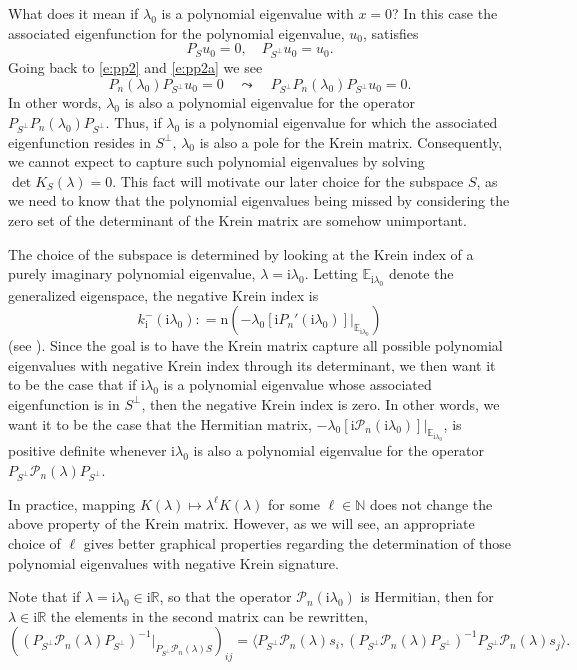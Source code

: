 \documentclass[review,onefignum,onetabnum]{siamart171218}
\newcommand{\E}{\mathbb{E}}
\newcommand{\N}{\mathbb{N}}
\newcommand{\R}{\mathbb{R}}
\def\det{\mathop\mathrm{det}\nolimits}
\def\coloneqq{\mathrel{\mathop:}=}
\newcommand{\rmi}{\mathrm{i}}
\newcommand{\rmn}{\mathrm{n}}
\newcommand{\calP}{\mathcal{P}}
\newcommand{\vK}{\bm{\mathit{K}}}
\newcommand{\vx}{\bm{\mathit{x}}}
\newcommand{\vn}{\bm{\mathit{0}}}
\begin{document}
What does it mean if $\lambda_0$ is a polynomial eigenvalue with $\vx=\vn$?
In this case the associated eigenfunction for the polynomial eigenvalue,
$u_0$, satisfies
\[
P_Su_0=0,\quad P_{S^\perp}u_0=u_0.
\]
Going back to \cref{e:pp2} and \cref{e:pp2a} we see
\[
P_n(\lambda_0)P_{S^\perp}u_0=0\quad\leadsto\quad
P_{S^\perp}P_n(\lambda_0)P_{S^\perp}u_0=0.
\]
In other words, $\lambda_0$ is also a polynomial eigenvalue for the operator
$P_{S^\perp}P_n(\lambda_0)P_{S^\perp}$. Thus, if $\lambda_0$ is a polynomial
eigenvalue for which the associated eigenfunction resides in
$S^\perp,\,\lambda_0$ is also a pole for the Krein matrix. Consequently, we
cannot expect to capture such polynomial eigenvalues by solving
$\det\vK_S(\lambda)=0$. This fact will motivate our later choice for the
subspace $S$, as we need to know that the polynomial eigenvalues being missed
by considering the zero set of the determinant of the Krein matrix are
somehow unimportant.

The choice of the subspace is determined by looking at the Krein index of a
purely imaginary polynomial eigenvalue, $\lambda=\rmi\lambda_0$. Letting
$\E_{\rmi\lambda_0}$ denote the generalized eigenspace, the negative Krein
index is
\[
k_\rmi^-(\rmi\lambda_0)\coloneqq
\rmn\left(-\lambda_0[\rmi P_n'(\rmi\lambda_0)]|_{\E_{\rmi\lambda_0}}\right)
\]
(see \cite{bronski:aii14}).
Since the goal is to have the Krein matrix capture all possible polynomial
eigenvalues with negative Krein index through its determinant, we then want
it to be the case that if $\rmi\lambda_0$ is a polynomial eigenvalue whose
associated eigenfunction is in $S^\perp$, then the negative Krein index is
zero. In other words, we want it to be the case that the Hermitian matrix,
$-\lambda_0[\rmi\calP_n(\rmi\lambda_0)]|_{\E_{\rmi\lambda_0}}$, is positive
definite whenever $\rmi\lambda_0$ is also a polynomial eigenvalue for the
operator $P_{S^\perp}\calP_n(\lambda)P_{S^\perp}$.

\begin{remark}
In practice, mapping $\vK(\lambda)\mapsto\lambda^\ell\vK(\lambda)$ for some
$\ell\in\N$ does not change the above property of the Krein matrix. However,
as we will see, an appropriate choice of $\ell$ gives better graphical
properties regarding the determination of those polynomial eigenvalues with
negative Krein signature.
\end{remark}

\begin{remark}
Note that if $\lambda=\rmi\lambda_0\in\rmi\R$, so that the operator $\calP_n(\rmi\lambda_0)$
is Hermitian, then for $\lambda\in\rmi\R$ the elements in the second matrix can be rewritten,
\[
\left((P_{S^\perp}\calP_n(\lambda)P_{S^\perp})^{-1}|_{P_{S^\perp}\calP_n(\lambda)S}\right)_{ij}=
\langle P_{S^\perp}\calP_n(\lambda)s_i,(P_{S^\perp}\calP_n(\lambda)P_{S^\perp})^{-1}P_{S^\perp}\calP_n(\lambda)s_j\rangle.
\]
\end{remark}
\end{document}
